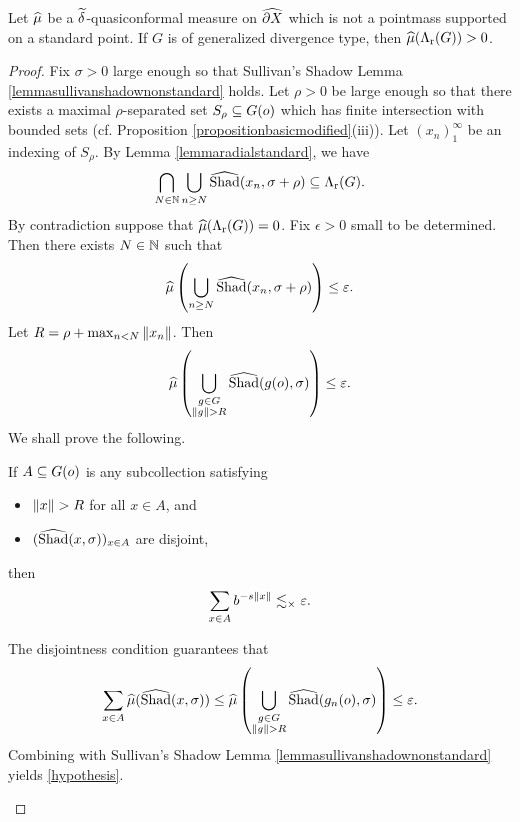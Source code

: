 \begin{proposition}
\label{propositionahlforsthurston}
Let $\widehat\mu$ be a $\widetilde\delta$-quasiconformal measure on $\widehat{\partial X}$ which is not a pointmass supported on a standard point. If $G$ is of generalized divergence type, then $\widehat\mu(\Lambda_{\mathrm r}(G)) > 0$.
\end{proposition}
\begin{proof}
Fix $\sigma > 0$ large enough so that Sullivan's Shadow Lemma \ref{lemmasullivanshadownonstandard} holds. Let $\rho > 0$ be large enough so that there exists a maximal $\rho$-separated set $S_\rho\subseteq G(o)$ which has finite intersection with bounded sets (cf. Proposition \ref{propositionbasicmodified}(iii)). Let $(x_n)_1^\infty$ be an indexing of $S_\rho$. By Lemma \ref{lemmaradialstandard}, we have 
\[
\bigcap_{N\in\N}\bigcup_{n\geq N}\what\Shad(x_n,\sigma + \rho) \subset \Lr(G).
\] 
By contradiction suppose that $\widehat\mu(\Lambda_{\mathrm r}(G)) = 0$. Fix $\epsilon > 0$ small to be determined. Then there exists $N\in\N$ such that
\[
\widehat\mu\left(\bigcup_{n\geq N}\widehat{\operatorname{Shad}}(x_n,\sigma + \rho)\right) \leq \varepsilon.
\]
Let $R = \rho + \max_{n < N}\|x_n\|$. Then
\[
\widehat\mu\left(\bigcup_{\substack{g\in G \\ \|g\| >
R}}\widehat{\operatorname{Shad}}(g(o),\sigma)\right) \leq \varepsilon. 
\]
We shall prove the following.

\begin{observation}
\label{observationhypothesis}
If $A\subseteq G(o)$ is any subcollection satisfying
\begin{itemize}
\item [(I)] $\|x\| > R$ for all $x\in A$, and
\item [(II)] $(\widehat{\operatorname{Shad}}(x,\sigma))_{x\in A}$ are disjoint,
\end{itemize}
then
\begin{equation}
\label{hypothesis}
\sum_{x\in A}b^{-s\|x\|} \lesssim_\times \varepsilon.
\end{equation}
\end{observation}
\begin{subproof}
The disjointness condition guarantees that
\[
\sum_{x\in A}\widehat\mu(\widehat{\operatorname{Shad}}(x,\sigma)) \leq \widehat\mu\left(\bigcup_{\substack{g\in G \\ \|g\| > R}}\widehat{\operatorname{Shad}}(g_n(o),\sigma)\right) \leq \varepsilon.
\]
Combining with Sullivan's Shadow Lemma \ref{lemmasullivanshadownonstandard} yields \eqref{hypothesis}.
\end{subproof}


\end{proof}
